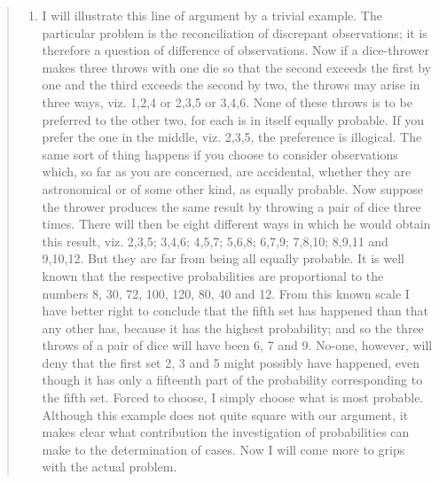 \documentclass[]{book}
\providecommand{\tightlist}{%
  \setlength{\itemsep}{0pt}\setlength{\parskip}{0pt}}
\begin{document}
\begin{quote}
\begin{enumerate}
\def\labelenumi{\arabic{enumi}.}
\setcounter{enumi}{8}
\tightlist
\item
  I will illustrate this line of argument by a trivial example. The particular problem is the reconciliation of discrepant observations; it is therefore a question of difference of observations. Now if a dice-thrower makes three throws with one die so that the second exceeds the first by one and the third exceeds the second by two, the throws may arise in three ways, viz. 1,2,4 or 2,3,5 or 3,4,6. None of these throws is to be preferred to the other two, for each is in itself equally probable. If you prefer the one in the middle, viz. 2,3,5, the preference is illogical. The same sort of thing happens if you choose to consider observations which, so far as you are concerned, are accidental, whether they are astronomical or of some other kind, as equally probable. Now suppose the thrower produces the same result by throwing a pair of dice three times. There will then be eight different ways in which he would obtain this result, viz. 2,3,5; 3,4,6; 4,5,7; 5,6,8; 6,7,9; 7,8,10; 8,9,11 and 9,10,12.
  But they are far from being all equally probable. It is well known that the respective probabilities are proportional to the numbers 8, 30, 72, 100, 120, 80, 40 and 12. From this known scale I have better right to conclude that the fifth set has happened than that any other has, because it has the highest probability; and so the three throws of a pair of dice will have been 6, 7 and 9. No-one, however, will deny that the first set 2, 3 and 5 might possibly have happened, even though it has only a fifteenth part of the probability corresponding to the fifth set. Forced to choose, I simply choose what is most probable. Although this example does not quite square with our argument, it makes clear what contribution the investigation of probabilities can make to the determination of cases. Now I will come more to grips with the actual problem.
\end{enumerate}
\end{quote}
\end{document}
